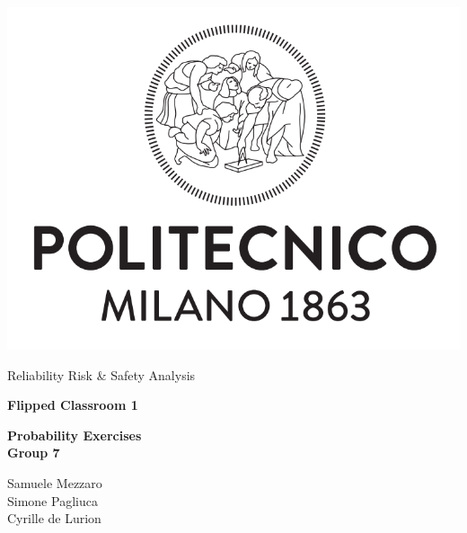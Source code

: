 \documentclass{article}
\begin{document}
\begin{titlepage}
	\clearpage\thispagestyle{empty}
	\center{
 
    }
	\vspace{2cm}

	
	\centering \includegraphics[scale=0.35]{Logo.png}
	
	
    	{\Huge Reliability Risk \& Safety Analysis \\ 
		\par}
		\vspace{1cm}

	{\Huge 
	\textbf{Flipped Classroom 1} \\
    }

	\vspace{1cm}
	{\Large
    	\textbf{Probability Exercises}\\
\vspace*{\fill}
}
	\vspace{1cm}
	{\Large \textbf{Group 7}}
 
Samuele Mezzaro\\ 
Simone Pagliuca\\
Cyrille de Lurion


\vspace*{\fill}

	
	\pagebreak

\end{titlepage}



\tableofcontents
\end{document}
